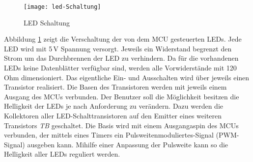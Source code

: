 \begin{figure}[h]
	\begin{center}
		\texttt{[image: led-Schaltung]}
		\caption{LED Schaltung}
		\label{fig:LED-Schaltung}
	\end{center}
\end{figure}
Abbildung \ref{fig:LED-Schaltung} zeigt die Verschaltung der von dem MCU gesteuerten LEDs. Jede LED wird mit 5\,V Spannung versorgt. Jeweils ein Widerstand begrenzt den Strom um das Durchbrennen der LED zu verhindern. Da für die vorhandenen LEDs keine Datenblätter verfügbar sind, werden alle Vorwiderstände mit 120\,Ohm dimensioniert. Das eigentliche Ein- und Ausschalten wird über jeweils einen Transistor realisiert. Die Basen des Transistoren werden mit jeweils einem Ausgang des MCUs verbunden. Der Benutzer soll die Möglichkeit besitzen die Helligkeit der LEDs je nach Anforderung zu verändern. Dazu werden die Kollektoren aller LED-Schalttransistoren auf den Emitter eines weiteren Transistors \textit{TB} geschaltet. Die Basis wird mit einem Ausgangaspin des MCUs verbunden, der mittels eines Timers ein Pulsweitenmoduliertes-Signal (PWM-Signal) ausgeben kann. Mihilfe einer Anpassung der Pulsweite kann so die Helligkeit aller LEDs reguliert werden. \\
%
